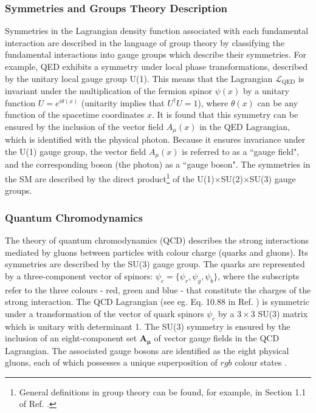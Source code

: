 \subsubsection{Symmetries and Groups Theory Description}

Symmetries in the Lagrangian density function associated with each fundamental interaction are described in the language of group theory by classifying the fundamental interactions into gauge groups which describe their symmetries. For example, QED exhibits a symmetry under local phase transformations, described by the unitary local gauge group U(1). This means that the Lagrangian \(\mathcal{L}_\text{QED}\) is invariant under the multiplication of the fermion spinor \(\psi(x)\) by a unitary function \(U = e^{i\theta(x)}\) (unitarity implies that \(U^\dagger U=1\)),
where \(\theta(x)\) can be any function of the spacetime coordinates \(x\). It is found that this symmetry can be ensured by the inclusion of the vector field \(A_\mu(x)\) in the QED Lagrangian, which is identified with the physical photon. Because it ensures invariance under the U(1) gauge group, the vector field \(A_\mu(x)\) is referred to as a ``gauge field", and the corresponding boson (the photon) as a ``gauge boson". The symmetries in the SM are described by the direct product\footnote{General definitions in group theory can be found, for example, in Section 1.1 of Ref. \cite{costa2012symmetries}.} of the U(1)\(\times\)SU(2)\(\times\)SU(3) gauge groups. 

\subsubsection{Quantum Chromodynamics}

The theory of quantum chromodynamics (QCD) \cite{qcd_2007} describes the strong interactions mediated by gluons between particles with colour charge (quarks and gluons). Its symmetries are described by the SU(3) gauge group. The quarks are represented by a three-component vector of spinors: \(\psi_c = \{\psi_r, \psi_g, \psi_b\}\), where the subscripts refer to the three colours - red, green and blue - that constitute the charges of the strong interaction. The QCD Lagrangian (see eg. Eq. 10.88 in Ref. \cite{griffiths_2008}) is symmetric under a transformation of the vector of quark spinors \(\psi_c\) by a \(3\times3\) SU(3) matrix which is unitary with determinant 1. The SU(3) symmetry is ensured by the inclusion of an eight-component set \(\boldsymbol{\boldsymbol{A}_\mu}\) of vector gauge fields in the QCD Lagrangian. The associated gauge bosons are identified as the eight physical gluons, each of which possesses a unique superposition of \({rgb}\) colour states \cite{griffiths_2008}.

